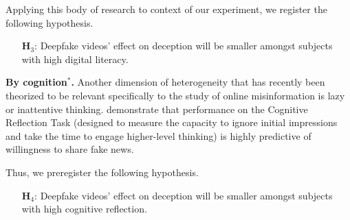 \documentclass[12pt,letterpaper]{article}
\begin{document}

Applying this body of research to context of our experiment, we register the following hypothesis.

\begin{itemize}
    \item[\textbf{H$_{3}$}:] Deepfake videos' effect on deception will be smaller amongst subjects with high digital literacy.
\end{itemize}

\noindent \textbf{By cognition$^{*}$.} Another dimension of heterogeneity that has recently been theorized to be relevant specifically to the study of online misinformation is lazy or inattentive thinking. \cite{pennycook2019lazy} demonstrate that performance on the Cognitive Reflection Task (designed to measure the capacity to ignore initial impressions and take the time to engage higher-level thinking) is highly predictive of willingness to share fake news. %

Thus, we preregister the following hypothesis.

\begin{itemize}
    \item[\textbf{H$_{4}$}:] Deepfake videos' effect on deception will be smaller amongst subjects with high cognitive reflection.
\end{itemize}
\end{document}
